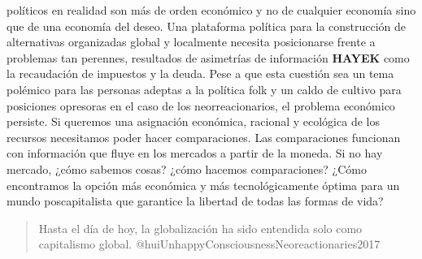 \documentclass[
]{article}
\begin{document}
políticos en realidad son más de orden económico y no de cualquier
economía sino que de una economía del deseo. Una plataforma política
para la construcción de alternativas organizadas global y localmente
necesita posicionarse frente a problemas tan perennes, resultados de
asimetrías de información \textbf{HAYEK} como la recaudación de
impuestos y la deuda. Pese a que esta cuestión sea un tema polémico para
las personas adeptas a la política folk y un caldo de cultivo para
posiciones opresoras en el caso de los neorreacionarios, el problema
económico persiste. Si queremos una asignación económica, racional y
ecológica de los recursos necesitamos poder hacer comparaciones. Las
comparaciones funcionan con información que fluye en los mercados a
partir de la moneda. Si no hay mercado, ¿cómo sabemos cosas? ¿cómo
hacemos comparaciones? ¿Cómo encontramos la opción más económica y más
tecnológicamente óptima para un mundo poscapitalista que garantice la
libertad de todas las formas de vida?

\begin{quote}
Hasta el día de hoy, la globalización ha sido entendida solo como
capitalismo global. @huiUnhappyConsciousnessNeoreactionaries2017
\end{quote}
\end{document}
